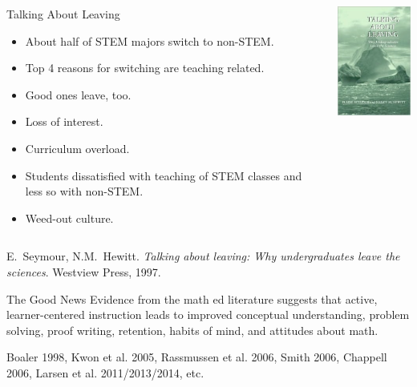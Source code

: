 \documentclass[10pt]{beamer}
\begin{document}
\begin{frame}

\begin{columns}[c]
\begin{block}{Talking About Leaving}
\begin{itemize}
\item About half of STEM majors switch to non-STEM.
\item Top 4 reasons for switching are teaching related.
\item Good ones leave, too.
\item Loss of interest.
\item Curriculum overload.
\item Students dissatisfied with teaching of STEM classes and less so with non-STEM.
\item Weed-out culture.
\end{itemize}
\end{block}
\begin{center}
\includegraphics[width=1.25in]{TalkingAboutLeaving.png}
\end{center}
\end{columns}

\vspace{1em}

E.~Seymour, N.M.~Hewitt. \emph{Talking about leaving: Why undergraduates leave the sciences}. Westview Press, 1997.

\end{frame}


\begin{frame}

\begin{block}{The Good News}
Evidence from the math ed literature suggests that active, learner-centered instruction leads to improved conceptual understanding, problem solving, proof writing, retention, habits of mind, and attitudes about math.

\vspace{1em}

Boaler 1998, Kwon et al. 2005, Rassmussen et al. 2006, Smith 2006, Chappell 2006, Larsen et al. 2011/2013/2014, etc.

\end{block}

\end{frame}
\end{document}
